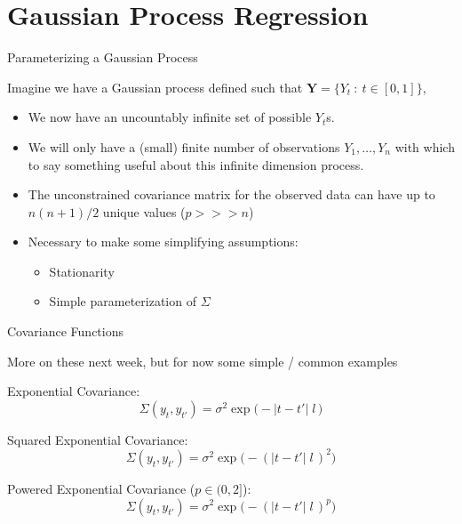 \documentclass[11pt,ignorenonframetext,]{beamer}
\providecommand{\tightlist}{%
  \setlength{\itemsep}{0pt}\setlength{\parskip}{0pt}}
\begin{document}
\section{Gaussian Process Regression}\label{gaussian-process-regression}

\begin{frame}[t]{Parameterizing a Gaussian Process}

Imagine we have a Gaussian process defined such that
\(\bm{Y} = \{Y_t ~:~ t \in [0,1]\}\),

\pause

\begin{itemize}
\tightlist
\item
  We now have an uncountably infinite set of possible \(Y_t\)s.
\end{itemize}

\pause

\begin{itemize}
\tightlist
\item
  We will only have a (small) finite number of observations
  \(Y_1, \ldots, Y_n\) with which to say something useful about this
  infinite dimension process.
\end{itemize}

\pause

\begin{itemize}
\tightlist
\item
  The unconstrained covariance matrix for the observed data can have up
  to \(n(n+1)/2\) unique values (\(p >>> n\))
\end{itemize}

\pause

\begin{itemize}
\item
  Necessary to make some simplifying assumptions:

  \begin{itemize}
  \item
    Stationarity
  \item
    Simple parameterization of \(\Sigma\)
  \end{itemize}
\end{itemize}

\end{frame}

\begin{frame}{Covariance Functions}

More on these next week, but for now some simple / common examples

Exponential Covariance:
\[ \Sigma(y_{t},y_{t'}) = \sigma^2 \exp\big(-|t-t'| \; l\,\big) \]

Squared Exponential Covariance:
\[ \Sigma(y_{t},y_{t'}) = \sigma^2 \exp\big(-(|t-t'| \; l\,)^2\big) \]

Powered Exponential Covariance (\(p \in (0,2]\)):
\[ \Sigma(y_{t},y_{t'}) = \sigma^2 \exp\big(-(|t-t'| \; l\,)^p\big) \]

\end{frame}
\end{document}
